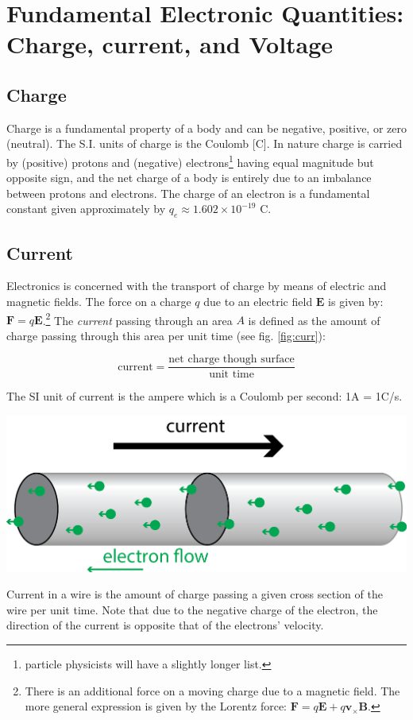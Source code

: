 \documentclass{tufte-book}
\begin{document}
\section{Fundamental Electronic Quantities: Charge, current, and Voltage}
\subsection{Charge} Charge is a fundamental property of a body and can be negative, positive, or zero (neutral). The S.I. units of charge is the Coulomb [C]. In nature charge is carried by (positive) protons and (negative) electrons\footnote{particle physicists will have a slightly longer list.} having equal magnitude but opposite sign, and the net charge of a body is entirely due to an imbalance between protons and electrons. The charge of an electron is a fundamental constant given approximately by $q_e \approx 1.602\times10^{-19}$ C. 

\subsection{Current} Electronics is concerned with the transport of charge by means of electric and magnetic fields. The force on a charge $q$ due to an electric field $\textbf{E}$ is given by: $\textbf{F} = q\textbf{E}$.\footnote{There is an additional force on a moving charge due to a magnetic field. The more general expression is given by the Lorentz force: $\textbf{F} = q\textbf{E} + q\textbf{v}_\times\textbf{B}$.} The \textit{current} passing through an area $A$ is defined as the amount of charge passing through this area per unit time (see fig. \ref{fig:curr}):

\begin{equation}\label{eq:defn_current_words}
\text{current} = \frac{\text{net charge though surface}}{\text{unit time}}
\end{equation}

\noindent The SI unit of current is the ampere which is a Coulomb per second: 1A = 1C/s.

\begin{marginfigure}%
  \includegraphics[width=\linewidth]{currentflow}
  \caption{Current in a wire is the amount of charge passing a given cross section of the wire per unit time. Note that due to the negative charge of the electron, the direction of the current is opposite that of the electrons' velocity.}
  \label{fig:curr}
\end{marginfigure}
\end{document}
